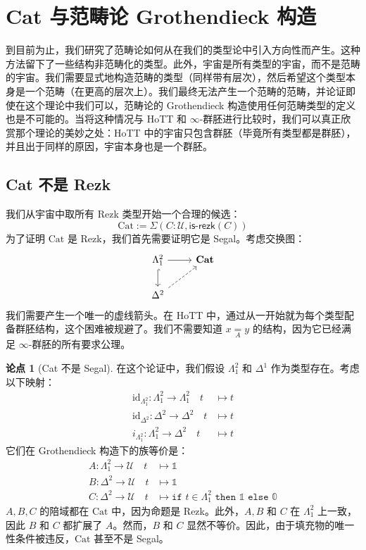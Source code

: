 \documentclass{ctexrep}
\theoremstyle{plain}
\theoremstyle{definition}
\theoremstyle{remark}
\theoremstyle{definition}
\theoremstyle{definition}
\theoremstyle{definition}
\newtheorem{argument}[theorem]{论点}
\newcommand{\coloneqq}{\mathrel{:=}}
\newcommand{\UU}{\mathcal{U}}
\newcommand{\Cat}{\mathrm{Cat}}
\begin{document}
\section{Cat 与范畴论 Grothendieck 构造}

到目前为止，我们研究了范畴论如何从在我们的类型论中引入方向性而产生。这种方法留下了一些结构非范畴化的类型。此外，宇宙是所有类型的宇宙，而不是范畴的宇宙。我们需要显式地构造范畴的类型（同样带有层次），然后希望这个类型本身是一个范畴（在更高的层次上）。我们最终无法产生一个范畴的范畴，并论证即使在这个理论中我们可以，范畴论的 Grothendieck 构造使用任何范畴类型的定义也是不可能的。当将这种情况与 HoTT 和 $\infty$-群胚进行比较时，我们可以真正欣赏那个理论的美妙之处：HoTT 中的宇宙只包含群胚（毕竟所有类型都是群胚），并且出于同样的原因，宇宙本身也是一个群胚。

\subsection{Cat 不是 Rezk}

我们从宇宙中取所有 Rezk 类型开始一个合理的候选：
\[
\Cat \coloneqq \Sigma(C:\UU, \mathsf{is\text{-}rezk}(C))
\]
为了证明 $\Cat$ 是 Rezk，我们首先需要证明它是 Segal。考虑交换图：
\[\begin{tikzcd}
	{\Lambda^2_1} & {\mathbf{Cat}} \\
	{\Delta^2}
	\arrow[from=1-1, to=1-2]
	\arrow[hook, from=1-1, to=2-1]
	\arrow[dashed, from=2-1, to=1-2]
\end{tikzcd}\]
我们需要产生一个唯一的虚线箭头。在 HoTT 中，通过从一开始就为每个类型配备群胚结构，这个困难被规避了。我们不需要知道 $x \underset{A}{=} y$ 的结构，因为它已经满足 $\infty$-群胚的所有要求公理。

\begin{argument}[Cat 不是 Segal]
在这个论证中，我们假设 $\Lambda_1^2$ 和 $\Delta^1$ 作为类型存在。考虑以下映射：
\begin{align*}
    \text{id}_{\Lambda^2_1} : \Lambda^2_1 \to \Lambda^2_1 \quad t &\mapsto t \\
    \text{id}_{\Delta^2} : \Delta^2 \to \Delta^2 \quad t &\mapsto t \\
    i_{\Lambda^2_1} : \Lambda^2_1 \to \Delta^2 \quad t &\mapsto t
\end{align*}
它们在 Grothendieck 构造下的族等价是：
\begin{align*}
    A : \Lambda^2_1 \to \mathcal{U} \quad t &\mapsto \mathbb{1} \\
    B : \Delta^2 \to \mathcal{U} \quad t &\mapsto \mathbb{1} \\
    C : \Delta^2 \to \mathcal{U} \quad t &\mapsto \texttt{if } t \in \Lambda^2_1 \texttt{ then } \mathbb{1} \texttt{ else } \mathbb{0}
\end{align*}
$A,B,C$ 的陪域都在 $\Cat$ 中，因为命题是 Rezk。此外，$A,B$ 和 $C$ 在 $\Lambda_1^2$ 上一致，因此 $B$ 和 $C$ 都扩展了 $A$。然而，$B$ 和 $C$ 显然不等价。因此，由于填充物的唯一性条件被违反，$\Cat$ 甚至不是 Segal。
\end{argument}
\end{document}
